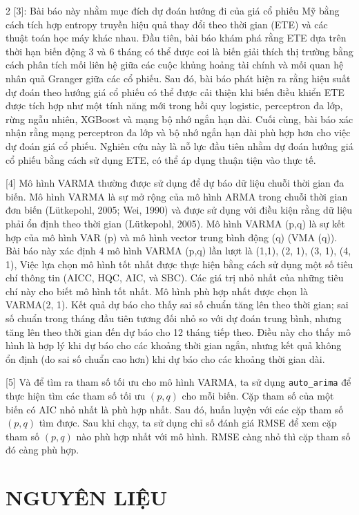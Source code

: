 \documentclass{article}
\begin{document}
\begin{multicols}{2}
[3]: Bài báo này nhằm mục đích dự đoán hướng đi của giá cổ phiếu Mỹ bằng cách tích hợp entropy truyền hiệu quả thay đổi theo thời gian (ETE) và các thuật toán học máy khác nhau. Đầu tiên, bài báo khám phá rằng ETE dựa trên thời hạn biến động 3 và 6 tháng có thể được coi là biến giải thích thị trường bằng cách phân tích mối liên hệ giữa các cuộc khủng hoảng tài chính và mối quan hệ nhân quả Granger giữa các cổ phiếu. Sau đó, bài báo phát hiện ra rằng hiệu suất dự đoán theo hướng giá cổ phiếu có thể được cải thiện khi biến điều khiển ETE được tích hợp như một tính năng mới trong hồi quy logistic, perceptron đa lớp, rừng ngẫu nhiên, XGBoost và mạng bộ nhớ ngắn hạn dài. Cuối cùng, bài báo xác nhận rằng mạng perceptron đa lớp và bộ nhớ ngắn hạn dài phù hợp hơn cho việc dự đoán giá cổ phiếu. Nghiên cứu này là nỗ lực đầu tiên nhằm dự đoán hướng giá cổ phiếu bằng cách sử dụng ETE, có thể áp dụng thuận tiện vào thực tế.

[4] Mô hình VARMA thường được sử dụng để dự báo dữ liệu chuỗi thời gian đa biến. Mô hình VARMA là sự mở rộng của mô hình ARMA trong chuỗi thời gian đơn biến (Lütkepohl, 2005; Wei, 1990) và được sử dụng với điều kiện rằng dữ liệu phải ổn định theo thời gian (Lütkepohl, 2005). Mô hình VARMA (p,q) là sự kết hợp của mô hình VAR (p) và mô hình vector trung bình động (q) (VMA (q)). Bài báo này xác định 4 mô hình VARMA (p,q) lần lượt là (1,1), (2, 1), (3, 1), (4, 1), Việc lựa chọn mô hình tốt nhất được thực hiện bằng cách sử dụng một số tiêu chí thông tin (AICC, HQC, AIC, và SBC). Các giá trị nhỏ nhất của những tiêu chí này cho biết mô hình tốt nhất. Mô hình phù hợp nhất được chọn là VARMA(2, 1). Kết quả dự báo cho thấy sai số chuẩn tăng lên theo thời gian; sai số chuẩn trong tháng đầu tiên tương đối nhỏ so với dự đoán trung bình, nhưng tăng lên theo thời gian đến dự báo cho 12 tháng tiếp theo. Điều này cho thấy mô hình là hợp lý khi dự báo cho các khoảng thời gian ngắn, nhưng kết quả không ổn định (do sai số chuẩn cao hơn) khi dự báo cho các khoảng thời gian dài.

[5] Và để tìm ra tham số tối ưu cho mô hình VARMA, ta sử dụng \texttt{auto\_arima} để thực hiện tìm các tham số tối ưu $(p, q)$ cho mỗi biến. Cặp tham số của một biến có AIC nhỏ nhất là phù hợp nhất. Sau đó, huấn luyện với các cặp tham số $(p, q)$ tìm được. Sau khi chạy, ta sử dụng chỉ số đánh giá RMSE để xem cặp tham số $(p, q)$ nào phù hợp nhất với mô hình. RMSE càng nhỏ thì cặp tham số đó càng phù hợp.

\section{NGUYÊN LIỆU}


\end{multicols}
\end{document}
